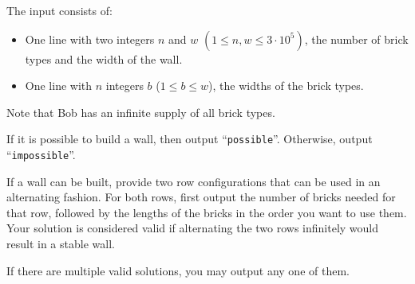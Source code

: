 \begin{Input}
    The input consists of:
    \begin{itemize}
        \item One line with two integers $n$ and $w$ $(1\leq n,w\leq3\cdot10^5)$, the number of brick types and the width of the wall.
        \item One line with $n$ integers $b$ ($1\leq b\leq w$), the widths of the brick types.
    \end{itemize}
        Note that Bob has an infinite supply of all brick types.
\end{Input}

\begin{Output}
If it is possible to build a wall, then output ``\texttt{possible}''.
Otherwise, output ``\texttt{impossible}''.

If a wall can be built, provide two row configurations that can be used in an alternating fashion.
For both rows, first output the number of bricks needed for that row, followed by the lengths of the bricks in the order you want to use them.
Your solution is considered valid if alternating the two rows infinitely would result in a stable wall.

If there are multiple valid solutions, you may output any one of them.
\end{Output}
